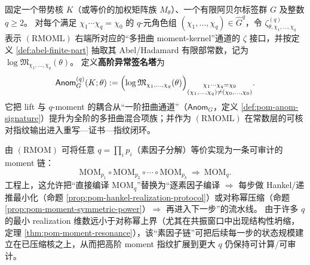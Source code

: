 \begin{definition}\label{def:pom-anom-signature-tower}
固定一个带势核 \(K\)（或等价的加权矩阵族 \(M_\theta\)）、一个有限阿贝尔标签群 \(G\) 及整数 \(q\ge 2\)。
对每个满足 \(\chi_1\cdots\chi_q=\chi_0\) 的 \(q\)-元角色组 \((\chi_1,\dots,\chi_q)\in\widehat G^q\)，令
\(\zeta^{(q)}_{\theta,\chi_1,\dots,\chi_q}\)
表示 \((\mathrm{RMOML})\) 右端所对应的“多扭曲 moment-kernel”通道的 \(\zeta\) 接口，并按定义 \ref{def:abel-finite-part} 抽取其 Abel/Hadamard 有限部常数，记为 \(\log\mathfrak{M}_{\chi_1,\dots,\chi_q}(\theta)\)。
定义\textbf{高阶异常签名塔}为
\[
\mathsf{Anom}^{(q)}_{G}(K;\theta)
:=\Bigl(\log\mathfrak{M}_{\chi_1,\dots,\chi_q}(\theta)\Bigr)_{\substack{\chi_1\cdots\chi_q=\chi_0\\ (\chi_1,\dots,\chi_q)\neq(\chi_0,\dots,\chi_0)}}.
\]
它把 lift 与 \(q\)-moment 的耦合从“一阶扭曲通道”（\(\mathsf{Anom}_G\)，定义 \ref{def:pom-anom-signature}）提升为全阶的多扭曲混合项族；并作为 \((\mathrm{RMOML})\) 在常数层的可核对指纹输出进入重写—证书—指纹闭环。
\end{definition}

\begin{remark}\label{rem:pom-mom-prime-factor-compiler}
由 \((\mathrm{RMOM})\) 可将任意 \(q=\prod_i p_i\)（素因子分解）等价实现为一条可审计的 moment 链：
\[
\mathrm{MOM}_{p_1}\circ\mathrm{MOM}_{p_2}\circ\cdots\circ\mathrm{MOM}_{p_k}
\ \Rightarrow\ \mathrm{MOM}_q.
\]
工程上，这允许把“直接编译 \(\mathrm{MOM}_q\)”替换为“逐素因子编译 \(\Rightarrow\) 每步做 Hankel/递推最小化（命题 \ref{prop:pom-hankel-realization-protocol}）或对称幂压缩（命题 \ref{prop:pom-moment-symmetric-power}）\(\Rightarrow\) 再进入下一步”的流水线。
由于许多 \(q\) 的最小 realization 维数远小于对称幂上界（尤其在共振窗口中出现结构性坍缩，定理 \ref{thm:pom-moment-resonance}），该“素因子链”可把后续每一步的状态规模建立在已压缩核之上，从而把高阶 moment 指纹扩展到更大 \(q\) 仍保持可计算/可审计。
\end{remark}

